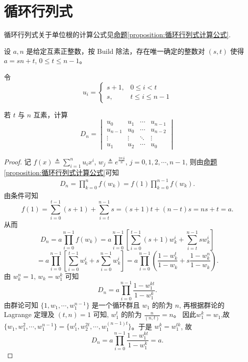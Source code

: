 \documentclass[../../main.tex]{subfiles}
\begin{document}
\section{循环行列式}

循环行列式关于单位根的计算公式见\hyperref[proposition:循环行列式计算公式]{命题\ref{proposition:循环行列式计算公式}}.

\begin{example}
设 $a, n$ 是给定互素正整数，按 Build 除法，存在唯一确定的整数对 $(s, t)$ 使得 $a = sn + t$, $0 \leq t \leq n - 1$。

令
\[u_i = 
\begin{cases} 
s + 1, & 0 \leq i < t \\
s, & t \leq i \leq n - 1 
\end{cases}\]

若 $t$ 与 $n$ 互素，计算
\[D_n =
\begin{vmatrix}
u_0 & u_1 & \cdots & u_{n-1} \\
u_{n-1} & u_0 & \cdots & u_{n-2} \\
\vdots & \vdots & \ddots & \vdots \\
u_1 & u_2 & \cdots & u_0
\end{vmatrix}\]
\end{example}
\begin{proof}
记 $f(x) \triangleq \sum_{i=1}^n u_i x^i$, $w_j \triangleq e^{\frac{2\pi j \mathrm{i} }{n}}$, $j=0,1,2,\cdots,n-1$, 则由\hyperref[proposition:循环行列式计算公式]{命题\ref{proposition:循环行列式计算公式}}可知
\begin{align*}
D_n=\prod_{k=0}^n{f\left( w_k \right)}=f\left( 1 \right) \prod_{k=0}^{n-1}{f\left( w_k \right)}.
\end{align*}
由条件可知
\[
f(1) = \sum_{i=0}^{t-1} (s+1) + \sum_{i=t}^{n-1} s = (s+1)t + (n-t)s = ns + t = a.
\]
从而
\[
D_n = a \prod_{i=0}^{n-1} f(w_k) = a \prod_{i=0}^{n-1} \left[ \sum_{i=0}^{t-1} (s+1) w_{k}^{i} + \sum_{i=t}^{n-1} s w_{k}^{i} \right]
\]
\[
= a \prod_{i=0}^{n-1} \left[ \sum_{i=0}^{t-1} w_{k}^{i} + s \sum_{i=0}^{n-1} w_{k}^{i} \right] = a \prod_{i=0}^{n-1} \left( \frac{1-w_{k}^{t}}{1-w_k} + s \frac{1-w_{k}^{n}}{1-w_k} \right).
\]
由 $w_{k}^{n} = 1$, $w_k = w_{1}^{k}$ 可知
\[
D_n = a \prod_{i=0}^{n-1} \frac{1-w_{1}^{kt}}{1-w_{1}^{k}}.
\]
由群论可知 $\{1, w_1, \cdots, w_{1}^{n-1}\}$ 是一个循环群且 $w_1$ 的阶为 $n$, 再根据群论的 Lagrange 定理及 $(t, n) = 1$ 可知, $w_{1}^{t}$ 的阶为 $\frac{n}{(n,t)} = n$。  
因此$w_1^k=w_1$,故$\{w_1, w_{1}^{2}, \cdots, w_{1}^{n-1}\} = \{w_{1}^{t}, w_{2}^{2t}, \cdots, w_{1}^{(n-1)t}\}$。于是 $w_{1}^{k} = w_{1}^{tk}$, 故
\[
D_n = a \prod_{i=0}^{n-1} \frac{1-w_{1}^{kt}}{1-w_{1}^{k}} = a.
\]
\end{proof}
\end{document}
